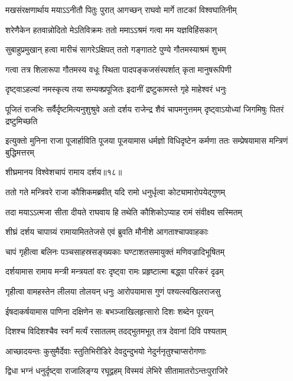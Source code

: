 \twolineshloka
{मखसंरक्षणार्थाय मयाऽऽनीतौ पितुः पुरात्}
{आगच्छन् राघवो मार्गे ताटकां विश्वघातिनीम्} %

\twolineshloka
{शरेणैकेन हतवान्नोदितो मेऽतिविक्रमः}
{ततो ममाऽऽश्रमं गत्वा मम यज्ञविहिंसकान्} %

\twolineshloka
{सुबाहुप्रमुखान् हत्वा मारीचं सागरेऽक्षिपत्}
{ततो गङ्गातटे पुण्ये गौतमस्याश्रमं शुभम्} %

\twolineshloka
{गत्वा तत्र शिलारूपा गौतमस्य वधूः स्थिता}
{पादपङ्कजसंस्पर्शात् कृता मानुषरूपिणी} %

\twolineshloka
{दृष्ट्वाऽहल्यां नमस्कृत्य तया सम्यक्प्रपूजितः}
{इदानीं द्रष्टुकामस्ते गृहे माहेश्वरं धनुः} %

\threelineshloka
{पूजितं राजभिः सर्वैर्दृष्टमित्यनुशुश्रुवे}
{अतो दर्शय राजेन्द्र शैवं चापमनुत्तमम्}
{दृष्ट्वाऽयोध्यां जिगमिषुः पितरं द्रष्टुमिच्छति} %

\threelineshloka
{इत्युक्तो मुनिना राजा पूजार्हाविति पूजया}
{पूजयामास धर्मज्ञो विधिदृष्टेन कर्मणा}
{ततः सम्प्रेषयामास मन्त्रिणं बुद्धिमत्तरम्} %


{शीघ्रमानय विश्वेशचापं रामाय दर्शय॥१८॥} %


\twolineshloka
{ततो गते मन्त्रिवरे राजा कौशिकमब्रवीत्}
{यदि रामो धनुर्धृत्वा कोट्यामारोपयेद्गुणम्} %

\twolineshloka
{तदा मयाऽऽत्मजा सीता दीयते राघवाय हि}
{तथेति कौशिकोऽप्याह रामं संवीक्ष्य सस्मितम्} %

\twolineshloka
{शीघ्रं दर्शय चापाग्र्यं रामायामिततेजसे}
{एवं ब्रुवति मौनीशे आगताश्चापवाहकाः} %

\twolineshloka
{चापं गृहीत्वा बलिनः पञ्चसाहस्रसङ्ख्यकाः}
{घण्टाशतसमायुक्तं मणिवज्रादिभूषितम्} %

\twolineshloka
{दर्शयामास रामाय मन्त्री मन्त्रयतां वरः}
{दृष्ट्वा रामः प्रहृष्टात्मा बद्\mbox{}ध्वा परिकरं दृढम्} %

\twolineshloka
{गृहीत्वा वामहस्तेन लीलया तोलयन् धनुः}
{आरोपयामास गुणं पश्यत्स्वखिलराजसु} %

\twolineshloka
{ईषदाकर्षयामास पाणिना दक्षिणेन सः}
{बभञ्जाखिलहृत्सारो दिशः शब्देन पूरयन्} %

\twolineshloka
{दिशश्च विदिशश्चैव स्वर्गं मर्त्यं रसातलम्}
{तदद्भुतमभूत् तत्र देवानां दिवि पश्यताम्} %

\twolineshloka
{आच्छादयन्तः कुसुमैर्देवाः स्तुतिभिरीडिरे}
{देवदुन्दुभयो नेदुर्ननृतुश्चाप्सरोगणाः} %

\twolineshloka
{द्विधा भग्नं धनुर्दृष्ट्वा राजालिङ्ग्य रघूद्वहम्}
{विस्मयं लेभिरे सीतामातरोऽन्तःपुराजिरे} %


